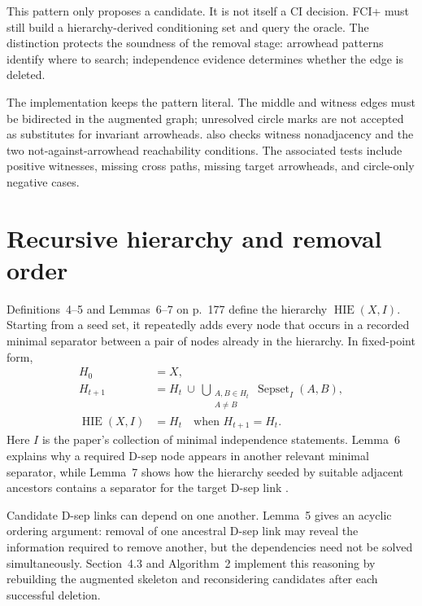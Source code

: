 \documentclass[11pt,a4paper,oneside]{report}
\begin{document}
This pattern only proposes a candidate.  It is not itself a CI decision.
FCI+ must still build a hierarchy-derived conditioning set and query the
oracle.  The distinction protects the soundness of the removal stage:
arrowhead patterns identify where to search; independence evidence determines
whether the edge is deleted.

The implementation keeps the pattern literal.  The middle and witness edges
must be bidirected in the augmented graph; unresolved circle marks are not
accepted as substitutes for invariant arrowheads.
 also checks witness nonadjacency and the two
not-against-arrowhead reachability conditions.  The associated tests include
positive witnesses, missing cross paths, missing target arrowheads, and
circle-only negative cases.

\section{Recursive hierarchy and removal order}

Definitions~4--5 and Lemmas~6--7 on p.~177 define the hierarchy
\(\operatorname{HIE}(X,I)\).  Starting from a seed set, it repeatedly adds
every node that occurs in a recorded minimal separator between a pair of
nodes already in the hierarchy.  In fixed-point form,
\[
\begin{split}
  H_0 &= X,\\
  H_{t+1}
    &= H_t\ \cup\
       \bigcup_{\substack{A,B\in H_t\\A\ne B}}
       \operatorname{Sepset}_{I}(A,B),\\
  \operatorname{HIE}(X,I) &= H_t
       \quad\text{when }H_{t+1}=H_t.
\end{split}
\]
Here \(I\) is the paper's collection of minimal independence statements.
Lemma~6 explains why a required D-sep node appears in another relevant
minimal separator, while Lemma~7 shows how the hierarchy seeded by suitable
adjacent ancestors contains a separator for the target D-sep link
\citep[pp.~177--178]{claassen2013learning}.

Candidate D-sep links can depend on one another.  Lemma~5 gives an acyclic
ordering argument: removal of one ancestral D-sep link may reveal the
information required to remove another, but the dependencies need not be
solved simultaneously.  Section~4.3 and Algorithm~2 implement this reasoning
by rebuilding the augmented skeleton and reconsidering candidates after each
successful deletion.
\end{document}

